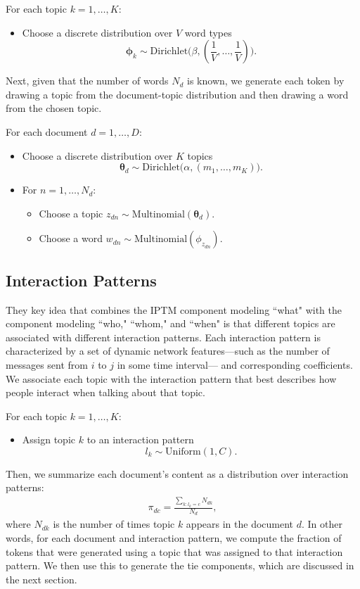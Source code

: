 \documentclass[twoside]{article}
\begin{document}
For each topic $k=1,\ldots,K$:
\begin{itemize}
	\item Choose a discrete distribution over $V$ word types $$\boldsymbol{\phi}_k \sim \mbox{Dirichlet}\Big(\beta, (\frac{1}{V},\ldots,\frac{1}{V})\Big).$$
\end{itemize}
Next, given that the number of words $N_d$ is known, we generate each token by drawing a topic from the document-topic distribution and then drawing a word from the chosen topic. 

For each document $d=1,\ldots,D$:
	\begin{itemize}
		\item Choose a discrete distribution over $K$ topics
	$$\boldsymbol{\theta}_d \sim \mbox{Dirichlet}\Big(\alpha, (m_1,\ldots,m_K)\Big).$$
	\item For $n=1,\ldots,N_d$:
	\begin{itemize}
		\item Choose a topic $z_{dn} \sim \mbox{Multinomial}(\boldsymbol{\theta}_d).$
		\item Choose a word $w_{dn} \sim\mbox{Multinomial} (\phi_{z_{dn}}).$
	\end{itemize}
\end{itemize}
\subsection{Interaction Patterns}\label{subsec:Interaction patterns}
They key idea that combines the IPTM component modeling ``what" with
the component modeling ``who," ``whom," and ``when" is that different
topics are associated with different interaction patterns.  Each interaction pattern is characterized by a set of dynamic network features---such as the number of messages sent from $i$ to $j$ in some time interval--- and corresponding coefficients. We associate each topic with the interaction pattern that best describes how people interact when talking about that topic. 

For each topic $k = 1,\ldots,K$:
\begin{itemize} 
	\item Assign topic $k$ to an interaction pattern
	$$l_k\sim \mbox{Uniform}(1, C).$$
\end{itemize}
 Then, we summarize each document's content as a distribution
 over interaction patterns:
\begin{align*}
\pi_{dc} = \frac{\sum_{k:l_k=c}N_{dk}}{N_d},
\end{align*}
 where $N_{dk}$ is the number of times topic $k$ appears in the document $d$. In other words, for each document and interaction pattern, we compute the fraction of tokens that were generated using a topic that was assigned to that interaction
 pattern.  We then use this to generate the tie components, which are discussed in the next section.
\end{document}

